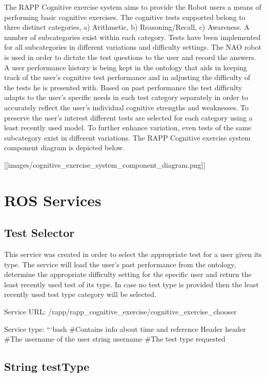 The R\-A\-P\-P Cognitive exercise system aims to provide the Robot users a means of performing basic cognitive exercises. The cognitive tests supported belong to three distinct categories, a) Arithmetic, b) Reasoning/\-Recall, c) Awareness. A number of subcategories exist within each category. Tests have been implemented for all subcategories in different variations and difficulty settings. The N\-A\-O robot is used in order to dictate the test questions to the user and record the answers. A user performance history is being kept in the ontology that aids in keeping track of the user’s cognitive test performance and in adjusting the difficulty of the tests he is presented with. Based on past performance the test difficulty adapts to the user’s specific needs in each test category separately in order to accurately reflect the user’s individual cognitive strengths and weaknesses. To preserve the user’s interest different tests are selected for each category using a least recently used model. To further enhance variation, even tests of the same subcategory exist in different variations. The R\-A\-P\-P Cognitive exercise system component diagram is depicted below.

\mbox{[}\mbox{[}images/cognitive\-\_\-exercise\-\_\-system\-\_\-component\-\_\-diagram.\-png\mbox{]}\mbox{]}

\section*{R\-O\-S Services}

\subsection*{Test Selector}

This service was created in order to select the appropriate test for a user given its type. The service will load the user’s past performance from the ontology, determine the appropriate difficulty setting for the specific user and return the least recently used test of its type. In case no test type is provided then the least recently used test type category will be selected.

Service U\-R\-L\-: {\ttfamily /rapp/rapp\-\_\-cognitive\-\_\-exercise/cognitive\-\_\-exercise\-\_\-chooser}

Service type\-: ```bash \#\-Contains info about time and reference Header header \#\-The username of the user string username \#\-The test type requested \subsection*{String test\-Type }

